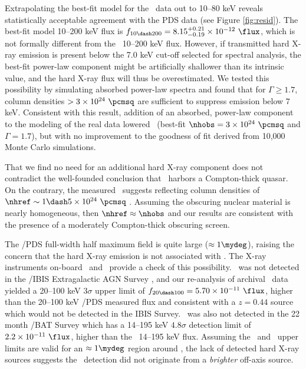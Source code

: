 \documentclass[useAMS,usenatbib]{mn2e}
\begin{document}
Extrapolating the best-fit model for the \cxo\ data out to 10--80 keV
reveals statistically acceptable agreement with the PDS data (see
Figure \ref{fig:resid}). The best-fit model 10--200 keV flux is $f_{10
  \dash 200} = 8.15^{+0.21}_{-0.19} \times 10^{-12} ~\flux$, which is
not formally different from the \bepposax\ 10--200 keV flux. However,
if transmitted hard X-ray emission is present below the 7.0 keV
cut-off selected for spectral analysis, the best-fit power-law
component might be artificially shallower than its intrinsic value, and
the hard X-ray flux will thus be overestimated. We tested this
possibility by simulating absorbed power-law spectra and found that
for $\Gamma \ge 1.7$, column densities $> 3 \times 10^{24} ~\pcmsq$
are sufficient to suppress emission below 7 keV. Consistent with this
result, addition of an absorbed, power-law component to the modeling
of the real data lowered \chisq\ (best-fit $\nhobs = 3 \times 10^{24}
~\pcmsq$ and $\Gamma = 1.7$), but with no improvement to the goodness
of fit derived from 10,000 Monte Carlo simulations.

That we find no need for an additional hard X-ray component does not
contradict the well-founded conclusion that \irs\ harbors a
Compton-thick quasar. On the contrary, the measured \fekaew\ suggests
reflecting column densities of $\nhref \sim 1 \dash 5 \times 10^{24}
~\pcmsq$ \citep{1993MNRAS.263..314L, 2005A&A...444..119G,
  2010arXiv1005.3253C}. Assuming the obscuring nuclear material is
nearly homogeneous, then $\nhref \approx \nhobs$ and our results are
consistent with the presence of a moderately Compton-thick obscuring
screen.

The \bepposax/PDS full-width half maximum field is quite large
($\approx 1\mydeg$), raising the concern that the hard X-ray emission
is not associated with \irs. The X-ray instruments on-board
\integral\ and \swift\ provide a check of this possibility. \irs\ was
not detected in the \integral/IBIS Extragalactic AGN Survey
\citep{2006ApJ...636L..65B}, and our re-analysis of archival
\integral\ data yielded a 20--100 keV $3\sigma$ upper limit of $f_{20
  \dash 100} = 5.70 \times 10^{-11} ~\flux$, higher than the 20--100
keV \bepposax/PDS measured flux and consistent with a $z=0.44$ source
which would not be detected in the IBIS Survey. \irs\ was also not
detected in the 22 month \swift/BAT Survey \citep{2010ApJS..186..378T}
which has a 14--195 keV $4.8\sigma$ detection limit of $2.2 \times
10^{-11} ~\flux$, higher than the \bepposax\ 14--195 keV
flux. Assuming the \integral\ and \swift\ upper limits are valid for
an $\approx 1\mydeg$ region around \irs, the lack of detected hard
X-ray sources suggests the \bepposax\ detection did not originate from
a {\it{brighter}} off-axis source.
\end{document}
